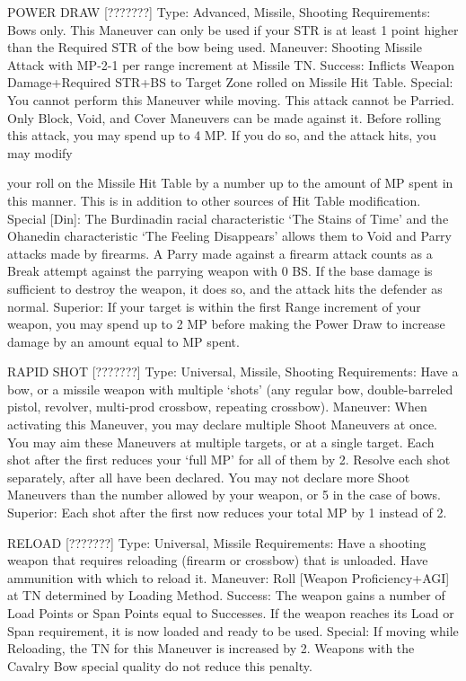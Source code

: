 \documentclass[oneside,11pt,english]{book}
\begin{document}
 

POWER DRAW [???????] 
Type: Advanced, Missile, Shooting 
Requirements: Bows only. This Maneuver can only be used if your STR is at least 1 point higher than 
the Required STR of the bow being used. 
Maneuver: Shooting Missile Attack with MP-2-1 per range increment at Missile TN. 
Success: Inflicts Weapon Damage+Required STR+BS to Target Zone rolled on Missile Hit Table. 
Special: You cannot perform this Maneuver while moving. 
This attack cannot be Parried. Only Block, Void, and Cover Maneuvers can be made against it. 
Before rolling this attack, you may spend up to 4 MP. If you do so, and the attack hits, you may modify 


your roll on the Missile Hit Table by a number up to the amount of MP spent in this manner. This is in 
addition to other sources of Hit Table modification. 
Special [Din]: The Burdinadin racial characteristic ‘The Stains of Time’ and the Ohanedin characteristic 
‘The Feeling Disappears’ allows them to Void and Parry attacks made by firearms. A Parry made against 
a firearm attack counts as a Break attempt against the parrying weapon with 0 BS. If the base damage is 
sufficient to destroy the weapon, it does so, and the attack hits the defender as normal. 
Superior: If your target is within the first Range increment of your weapon, you may spend up to 2 MP 
before making the Power Draw to increase damage by an amount equal to MP spent. 

 

RAPID SHOT [???????] 
Type: Universal, Missile, Shooting 
Requirements: Have a bow, or a missile weapon with multiple ‘shots’ (any regular bow, double-barreled 
pistol, revolver, multi-prod crossbow, repeating crossbow). 
Maneuver: When activating this Maneuver, you may declare multiple Shoot Maneuvers at once. You 
may aim these Maneuvers at multiple targets, or at a single target. Each shot after the first reduces your 
‘full MP’ for all of them by 2. Resolve each shot separately, after all have been declared. You may not 
declare more Shoot Maneuvers than the number allowed by your weapon, or 5 in the case of bows. 
Superior: Each shot after the first now reduces your total MP by 1 instead of 2. 

 

RELOAD [???????] 
Type: Universal, Missile 
Requirements: Have a shooting weapon that requires reloading (firearm or crossbow) that is unloaded. 
Have ammunition with which to reload it. 
Maneuver: Roll [Weapon Proficiency+AGI] at TN determined by Loading Method. 
Success: The weapon gains a number of Load Points or Span Points equal to Successes. If the weapon 
reaches its Load or Span requirement, it is now loaded and ready to be used. 
Special: If moving while Reloading, the TN for this Maneuver is increased by 2. Weapons with the 
Cavalry Bow special quality do not reduce this penalty. 
\end{document}
